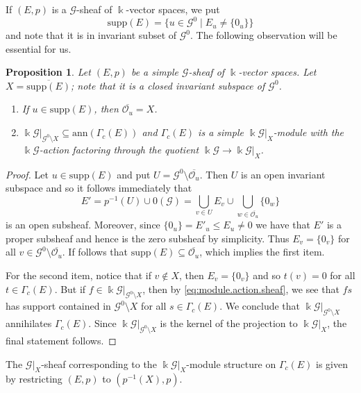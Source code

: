 \documentclass[11pt,reqno]{amsart}
\theoremstyle{plain}
\newtheorem{prop}[thm]{Proposition}
\numberwithin{equation}{section}
\newcommand{\orb}[0]{\mathcal{O}}
\begin{document}
If $(E,p)$ is a $\mathscr G$-sheaf of $\Bbbk$-vector spaces, we put
\[\mathrm{supp}(E) = \{u\in \mathscr G^0\mid E_u\neq \{0_u\}\}\] and note that it is in invariant subset of $\mathscr G^0$.  The following observation will be essential for us.

\begin{prop}\label{p:simple.sheaf}
Let $(E,p)$ be a simple $\mathscr G$-sheaf of $\Bbbk$-vector spaces.  Let $X=\overline{\mathrm{supp}(E)}$; note that it is a closed invariant subspace of $\mathscr G^0$.
\begin{enumerate}
\item If $u\in \mathrm{supp}(E)$, then $\overline{\orb_u}=X$.
\item  $\Bbbk\mathscr G|_{\mathscr G^0\setminus X}\subseteq \mathrm{ann}(\Gamma_c(E))$ and $\Gamma_c(E)$ is a simple $\Bbbk \mathscr G|_X$-module with the $\Bbbk\mathscr G$-action factoring through the quotient $\Bbbk\mathscr G\to \Bbbk\mathscr G|_X$.
\end{enumerate}
\end{prop}
\begin{proof}
Let $u\in \mathrm{supp}(E)$ and put $U = \mathscr G^0\setminus \overline{\orb_u}$.  Then $U$ is an open invariant subspace and so it follows immediately that \[E' = p^{-1}(U)\cup 0(\mathscr G)=\bigcup_{v\in U}E_v\cup \bigcup_{w\in \overline{\orb_u}}\{0_w\}\] is an open subsheaf.  Moreover,  since $\{0_u\}=E'_u\leq E_u\neq 0$ we have that $E'$ is a proper subsheaf and hence is the zero subsheaf by simplicity. Thus $E_v=\{0_v\}$ for all $v\in \mathscr G^0\setminus \overline{\orb_u}$.  If follows that $\mathrm{supp}(E)\subseteq \overline{\orb_u}$, which implies the first item.

For the second item, notice that if $v\notin X$, then $E_v=\{0_v\}$  and so $t(v)=0$ for all $t\in \Gamma_c(E)$.  But if $f\in \Bbbk\mathscr G|_{\mathscr G^0\setminus X}$, then by \eqref{eq:module.action.sheaf}, we see that $fs$ has support contained in $\mathscr G^0\setminus X$ for all $s\in \Gamma_c(E)$.  We conclude that $\Bbbk\mathscr G|_{\mathscr G^0\setminus X}$ annihilates $\Gamma_c(E)$.   Since $\Bbbk\mathscr G|_{\mathscr G^0\setminus X}$ is the kernel of the projection to $\Bbbk\mathscr G|_X$, the final statement follows.
\end{proof}

\begin{remark}
The $\mathscr G|_X$-sheaf corresponding to the $\Bbbk\mathscr G|_X$-module structure on $\Gamma_c(E)$ is given by restricting $(E,p)$ to $(p^{-1}(X),p)$.
\end{remark}
\end{document}
